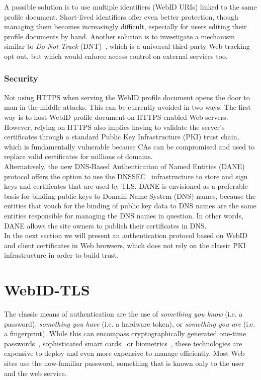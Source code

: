 A possible solution is to use multiple identifiers (WebID URIs) linked to the same profile document. Short-lived identifiers offer even better protection, though managing them becomes increasingly difficult, especially for users editing their profile documents by hand. Another solution is to investigate a mechanism similar to \textit{Do Not Track} (DNT)~\cite{mayer2011not}, which is a universal third-party Web tracking opt out, but which would enforce access control on external services too.

\subsubsection{Security}
Not using HTTPS when serving the WebID profile document opens the door to man-in-the-middle attacks. This can be currently avoided in two ways. The first way is to host WebID profile document on HTTPS-enabled Web servers. However, relying on HTTPS also implies having to validate the server's certificates through a standard Public Key Infrastructure (PKI) trust chain, which is fundamentally vulnerable because CAs can be compromised and used to replace valid certificates for millions of domains.\\

Alternatively, the new DNS-Based Authentication of Named Entities (DANE)~\cite{hoffman2012dns} protocol offers the option to use the DNSSEC~\cite{ateniese2001new} infrastructure to store and sign keys and certificates that are used by TLS. DANE is envisioned as a preferable basis for binding public keys to Domain Name System (DNS) names, because the entities that vouch for the binding of public key data to DNS names are the same entities responsible for managing the DNS names in question. In other words, DANE allows the site owners to publish their certificates in DNS.\\

In the next section we will present an authentication protocol based on WebID and client certificates in Web browsers, which does not rely on the classic PKI infrastructure in order to build trust.


\section{WebID-TLS}
\label{sec:webid-auth}
The classic means of authentication are the use of \textit{something you know} (i.e. a password), \textit{something you have} (i.e. a hardware token), or \textit{something you are} (i.e. a fingerprint). While this can encompass cryptographically generated one-time passwords~\cite{haller1996one}, sophisticated smart cards~\cite{schnorr1990efficient} or biometrics~\cite{snelick2005large}, these technologies are expensive to deploy and even more expensive to manage efficiently. Most Web sites use the now-familiar password, something that is known only to the user and the web service.\\

